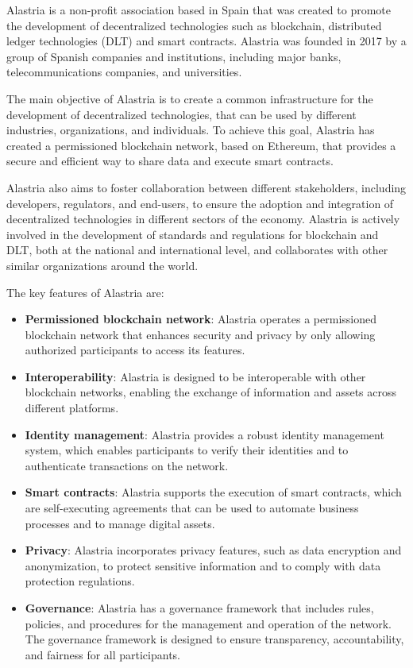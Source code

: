 \documentclass[target=mst,aauheader=]{thud}
\begin{document}
    Alastria is a non-profit association based in Spain that was created to promote the development of decentralized technologies such as blockchain, distributed ledger technologies (DLT) and smart contracts. Alastria was founded in 2017 by a group of Spanish companies and institutions, including major banks, telecommunications companies, and universities.\par
    The main objective of Alastria is to create a common infrastructure for the development of decentralized technologies, that can be used by different industries, organizations, and individuals. To achieve this goal, Alastria has created a permissioned blockchain network, based on Ethereum, that provides a secure and efficient way to share data and execute smart contracts.\par
    Alastria also aims to foster collaboration between different stakeholders, including developers, regulators, and end-users, to ensure the adoption and integration of decentralized technologies in different sectors of the economy. Alastria is actively involved in the development of standards and regulations for blockchain and DLT, both at the national and international level, and collaborates with other similar organizations around the world.\par
    The key features of Alastria are:

    \begin{itemize}
        \item \textbf{Permissioned blockchain network}: Alastria operates a permissioned blockchain network that enhances security and privacy by only allowing authorized participants to access its features.
        \item \textbf{Interoperability}: Alastria is designed to be interoperable with other blockchain networks, enabling the exchange of information and assets across different platforms.
        \item \textbf{Identity management}: Alastria provides a robust identity management system, which enables participants to verify their identities and to authenticate transactions on the network.
        \item \textbf{Smart contracts}: Alastria supports the execution of smart contracts, which are self-executing agreements that can be used to automate business processes and to manage digital assets.
        \item \textbf{Privacy}: Alastria incorporates privacy features, such as data encryption and anonymization, to protect sensitive information and to comply with data protection regulations.
        \item \textbf{Governance}: Alastria has a governance framework that includes rules, policies, and procedures for the management and operation of the network. The governance framework is designed to ensure transparency, accountability, and fairness for all participants.
    \end{itemize}
\end{document}
